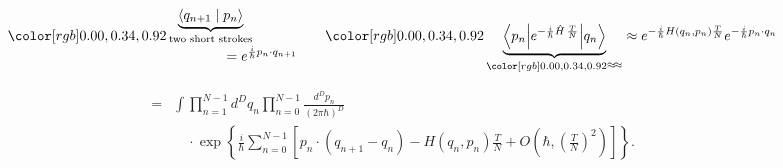 \[
\YinBlue{%
\begin{aligned}
 &\underbrace{\langle q_{n+1}\mid p_n\rangle}_{\text{\scriptsize two short strokes}}\\[-2pt]
 &\hspace{4em}
 =e^{\frac{i}{\hbar}p_n\cdot q_{n+1}}
\end{aligned}}
\qquad
\YinBlue{%
\underbrace{\left\langle p_n\middle|
 e^{-\frac{i}{\hbar}\hat H\,\frac{T}{N}}\middle|q_n\right\rangle}_{
 \YinBlue{\scriptstyle\text{\raisebox{1pt}{\(\approx\!\approx\)}}}}
 \approx
 e^{-\frac{i}{\hbar}H(q_n,p_n)\frac{T}{N}}
 e^{-\frac{i}{\hbar}p_n\cdot q_n}}
\]

\[
\begin{aligned}
={}&\int\prod_{n=1}^{N-1}d^Dq_n
 \prod_{n=0}^{N-1}\frac{d^Dp_n}{(2\pi\hbar)^D}\\[-2pt]
&\quad\cdot\exp\left\{
 \frac{i}{\hbar}\sum_{n=0}^{N-1}
 \left[
 p_n\cdot(q_{n+1}-q_n)
 -H(q_n,p_n)\frac{T}{N}
 +O\left(\hbar,\left(\frac{T}{N}\right)^2\right)
 \right]\right\}.
\end{aligned}
\]




